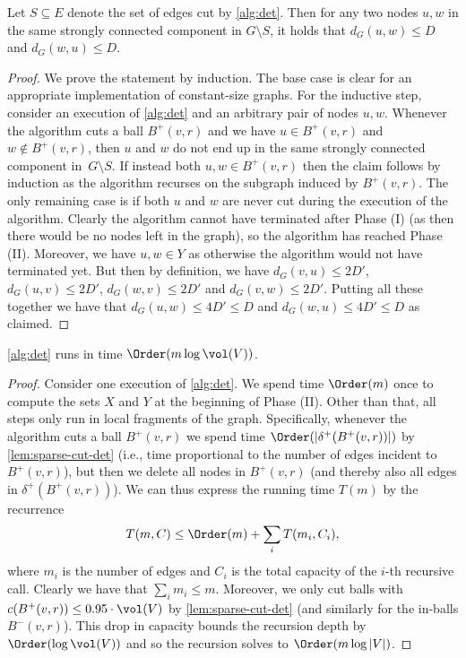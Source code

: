 \begin{lemma} \label{lem:ldd-det-correctness}
Let $S \subseteq E$ denote the set of edges cut by \cref{alg:det}. Then for any two nodes $u, w$ in the same strongly connected component in $G \setminus S$, it holds that $d_G(u, w) \leq D$ and $d_G(w, u) \leq D$.
\end{lemma}
\begin{proof}
We prove the statement by induction. The base case is clear for an appropriate implementation of constant-size graphs. For the inductive step, consider an execution of \cref{alg:det} and an arbitrary pair of nodes $u, w$. Whenever the algorithm cuts a ball $B^+(v, r)$ and we have $u \in B^+(v, r)$ and $w \not\in B^+(v, r)$, then $u$ and $w$ do not end up in the same strongly connected component in~$G \setminus S$. If instead both $u, w \in B^+(v, r)$ then the claim follows by induction as the algorithm recurses on the subgraph induced by $B^+(v, r)$. The only remaining case is if both $u$ and $w$ are never cut during the execution of the algorithm. Clearly the algorithm cannot have terminated after Phase (I) (as then there would be no nodes left in the graph), so the algorithm has reached Phase (II). Moreover, we have $u, w \in Y$ as otherwise the algorithm would not have terminated yet. But then by definition, we have $d_G(v, u) \leq 2D'$, $d_G(u, v) \leq 2D'$, $d_G(w, v) \leq 2D'$ and $d_G(v, w) \leq 2D'$. Putting all these together we have that $d_G(u, w) \leq 4D' \leq D$ and $d_G(w, u) \leq 4D' \leq D$ as claimed.
\end{proof}

\begin{lemma} \label{lem:ldd-det-time}
\cref{alg:det} runs in time $\Order(m \log \vol(V))$.
\end{lemma}
\begin{proof}
Consider one execution of \cref{alg:det}. We spend time $\Order(m)$ once to compute the sets $X$ and $Y$ at the beginning of Phase (II). Other than that, all steps only run in local fragments of the graph. Specifically, whenever the algorithm cuts a ball $B^+(v, r)$ we spend time $\Order(|\delta^+(B^+(v, r))|)$ by \cref{lem:sparse-cut-det} (i.e., time proportional to the number of edges incident to $B^+(v, r)$), but then we delete all nodes in $B^+(v, r)$ (and thereby also all edges in $\delta^+(B^+(v, r))$). We can thus express the running time $T(m)$ by the recurrence
\begin{equation*}
	T(m, C) \leq \Order(m) + \sum_i T(m_i, C_i),
\end{equation*}
where $m_i$ is the number of edges and $C_i$ is the total capacity of the $i$-th recursive call. Clearly we have that $\sum_i m_i \leq m$. Moreover, we only cut balls with $c(B^+(v, r)) \leq 0.95 \cdot \vol(V)$ by \cref{lem:sparse-cut-det} (and similarly for the in-balls $B^-(v, r)$). This drop in capacity bounds the recursion depth by $\Order(\log \vol(V))$ and so the recursion solves to $\Order(m \log |V|)$.
\end{proof}

